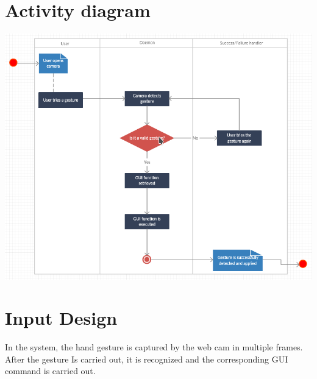 \documentclass[11pt]{report}
\begin{document}
\section{Activity diagram}
\begin{center}
    \includegraphics[scale=0.8]{activitydiagram.png}
\end{center}

\section{Input Design}
    In the system, the hand gesture is captured by the web cam in multiple frames. After the gesture Is
    carried out, it is recognized and the corresponding GUI command is carried out.

\end{document}
